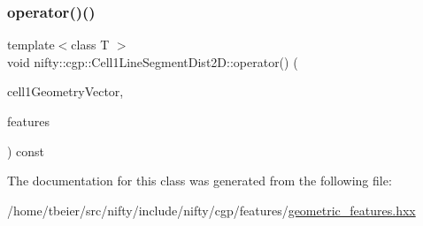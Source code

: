 \mbox{\label{classnifty_1_1cgp_1_1Cell1LineSegmentDist2D_a1afe73d1ba1b663559ef07ca83996a1a}} 
\subsubsection{\texorpdfstring{operator()()}{operator()()}}
{\footnotesize\ttfamily template$<$class T $>$ \\
void nifty\+::cgp\+::\+Cell1\+Line\+Segment\+Dist2\+D\+::operator() (\begin{DoxyParamCaption}\item[{const \hyperlink{classnifty_1_1cgp_1_1CellGeometryVector}{Cell\+Geometry\+Vector}$<$ 2, 1 $>$ \&}]{cell1\+Geometry\+Vector,  }\item[{\hyperlink{classandres_1_1View}{nifty\+::marray\+::\+View}$<$ T $>$ \&}]{features }\end{DoxyParamCaption}) const\hspace{0.3cm}{\ttfamily [inline]}}



The documentation for this class was generated from the following file\+:\begin{DoxyCompactItemize}
\item 
/home/tbeier/src/nifty/include/nifty/cgp/features/\hyperlink{geometric__features_8hxx}{geometric\+\_\+features.\+hxx}\end{DoxyCompactItemize}
